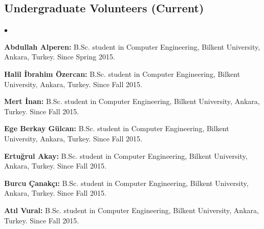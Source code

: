 \documentclass[margin,line]{res}
\newenvironment{list2}{
  \begin{list}{$\bullet$}{%
      \setlength{\itemsep}{0in}
      \setlength{\parsep}{0in} \setlength{\parskip}{0in}
      \setlength{\topsep}{0in} \setlength{\partopsep}{0in} 
      \setlength{\leftmargin}{0.2in}}}{\end{list}}
\begin{document}
\begin{resume}
  \subsection{\small \sc Undergraduate Volunteers (Current)}
  \begin{list2}
    \item 
      {\bf Abdullah Alperen:} B.Sc. student in Computer Engineering,  Bilkent University, Ankara, Turkey. Since Spring 2015. 
    \item 
      {\bf Halil İbrahim Özercan:} B.Sc. student in Computer Engineering,  Bilkent University, Ankara, Turkey. Since Fall 2015. 
    \item 
      {\bf Mert İnan:} B.Sc. student in Computer Engineering,  Bilkent University, Ankara, Turkey. Since Fall 2015. 
    \item 
      {\bf Ege Berkay Gülcan:} B.Sc. student in Computer Engineering,  Bilkent University, Ankara, Turkey. Since Fall 2015. 
    \item 
      {\bf Ertuğrul Akay:} B.Sc. student in Computer Engineering,  Bilkent University, Ankara, Turkey. Since Fall 2015. 
    \item
      {\bf Burcu Çanakçı:} B.Sc. student in Computer Engineering,  Bilkent University, Ankara, Turkey. Since Fall 2015. 
    \item
      {\bf Atıl Vural:} B.Sc. student in Computer Engineering,  Bilkent University, Ankara, Turkey. Since Fall 2015. 
  \end{list2}

\vspace*{-.6cm}

\end{resume}
\end{document}
